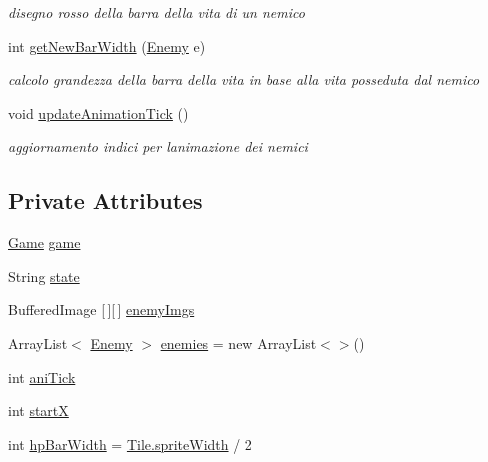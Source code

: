 \begin{DoxyCompactItemize}
\begin{DoxyCompactList}\small\item\em disegno rosso della barra della vita di un nemico \end{DoxyCompactList}\item 
int \hyperlink{classmanagers_1_1_enemy_manager_ac01087314c8b4df0d2304a3596493393}{get\+New\+Bar\+Width} (\hyperlink{classenemies_1_1_enemy}{Enemy} e)
\begin{DoxyCompactList}\small\item\em calcolo grandezza della barra della vita in base alla vita posseduta dal nemico \end{DoxyCompactList}\item 
void \hyperlink{classmanagers_1_1_enemy_manager_a5c2bac0f4b9a3ef4e30f60d4b0c3b951}{update\+Animation\+Tick} ()
\begin{DoxyCompactList}\small\item\em aggiornamento indici per l\textquotesingle{}animazione dei nemici \end{DoxyCompactList}\end{DoxyCompactItemize}
\subsection*{Private Attributes}
\begin{DoxyCompactItemize}
\item 
\hyperlink{classprogetto_1_1_game}{Game} \hyperlink{classmanagers_1_1_enemy_manager_ac6a5ed6191fcf3a5bf0445921feb4f48}{game}
\item 
String \hyperlink{classmanagers_1_1_enemy_manager_a91ac952876f776b3fbbc8519e093fdbf}{state}
\item 
Buffered\+Image \mbox{[}$\,$\mbox{]}\mbox{[}$\,$\mbox{]} \hyperlink{classmanagers_1_1_enemy_manager_a9de203ec47003324b7c89753f1e73085}{enemy\+Imgs}
\item 
Array\+List$<$ \hyperlink{classenemies_1_1_enemy}{Enemy} $>$ \hyperlink{classmanagers_1_1_enemy_manager_abb3ec53dfa3d7170202a47e10d3488cf}{enemies} = new Array\+List$<$$>$()
\item 
int \hyperlink{classmanagers_1_1_enemy_manager_a04d62de5f8367e549268b6c5540e1e97}{ani\+Tick}
\item 
int \hyperlink{classmanagers_1_1_enemy_manager_a85da7669cabd63b0459f1335886dbf2e}{startX}
\item 
int \hyperlink{classmanagers_1_1_enemy_manager_af1fa29fbf67dd56219be7fad4d77e342}{hp\+Bar\+Width} = \hyperlink{classobjects_1_1_tile_afbef0b8f1824dfedcb984b1547cc0dde}{Tile.\+sprite\+Width} / 2
\end{DoxyCompactItemize}


